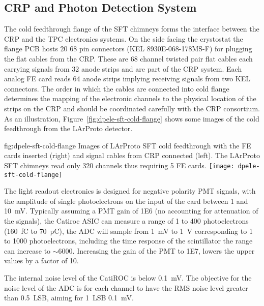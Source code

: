 \subsection{CRP and Photon Detection System}
\label{sec:fddp-tpc-elec-intfc-crppmt}

The cold feedthrough flange of the SFT chimneys forms the interface between the CRP and the TPC electronics systems. On the side facing the crystostat the flange PCB hosts \num{20} \num{68} pin connectors (KEL 8930E-068-178MS-F) for plugging the flat cables from the CRP. These are 68 channel twisted pair flat cables each carrying signals from \num{32} anode strips and are part of the CRP system. Each analog FE card reads \num{64} anode strips implying receiving signals from two KEL connectors. The order in which the cables are connected into cold flange determines the mapping of the electronic channels to the physical location of the strips on the CRP and should be coordinated carefully with the CRP consortium. As an illustration, Figure~\ref{fig:dpele-sft-cold-flange} shows some images of the cold feedthrough from the LArProto detector.

\begin{dunefigure}{fig:dpele-sft-cold-flange}
{Images of LArProto SFT cold feedthrough with the FE cards inserted (right) and signal cables from CRP connected (left). The LArProto SFT chimneys read only \num{320} channels thus requiring \num{5} FE cards.}
\texttt{[image: dpele-sft-cold-flange]}
\end{dunefigure}

The light readout electronics is designed for negative polarity PMT signals, with the amplitude of single photoelectrons on the input of the card between \num{1} and \SI{10}{\milli\volt}. Typically assuming a PMT gain of \num{1E6} (no accounting for attenuation of the signals), the Catiroc ASIC can measure a range of \num{1} to \num{400} photoelectrons (\SI{160}{\femto\coulomb} to \SI{70}{\pico\coulomb}), the ADC will sample from \SI{1}{\milli\volt} to \SI{1}{\volt} corresponding to \num{1} to \num{1000} photoelectrons, including the time response of the scintillator the range can increase to $\sim$\num{6000}. Increasing the gain of the PMT to \num{1E7}, lowers the upper values by a factor of 10.

The internal noise level of the CatiROC is below \SI{0.1}{\milli\volt}. The objective for the noise level of the ADC is for each channel to have the RMS noise level greater than \SI{0.5}{LSB}, aiming for \SI{1}{LSB} \SI{0.1}{\milli\volt}.


